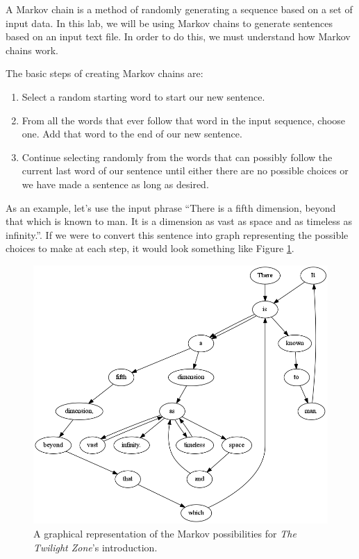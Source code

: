 \documentclass[11pt]{cselabheader}
\begin{document}
A Markov chain is a method of randomly generating a sequence based on a set of input data. In this lab, we will be using Markov chains to generate sentences based on an input text file. In order to do this, we must understand how Markov chains work.

The basic steps of creating Markov chains are:
\begin{enumerate}
\item Select a random starting word to start our new sentence.
\item From all the words that ever follow that word in the input sequence, choose one. Add that word to the end of our new sentence.
\item Continue selecting randomly from the words that can possibly follow the current last word of our sentence until either there are no possible choices or we have made a sentence as long as desired.
\end{enumerate}

As an example, let's use the input phrase ``There is a fifth dimension, beyond that which is known to man. It is a dimension as vast as space and as timeless as infinity.''. If we were to convert this sentence into graph representing the possible choices to make at each step, it would look something like Figure \ref{twilight}.

\begin{figure}[h]
  \centering
  \includegraphics[width=\linewidth]{lab10/twilight_zone}
  \caption{A graphical representation of the Markov possibilities for \emph{The Twilight Zone}'s introduction.}
  \label{twilight}
\end{figure}
\end{document}
